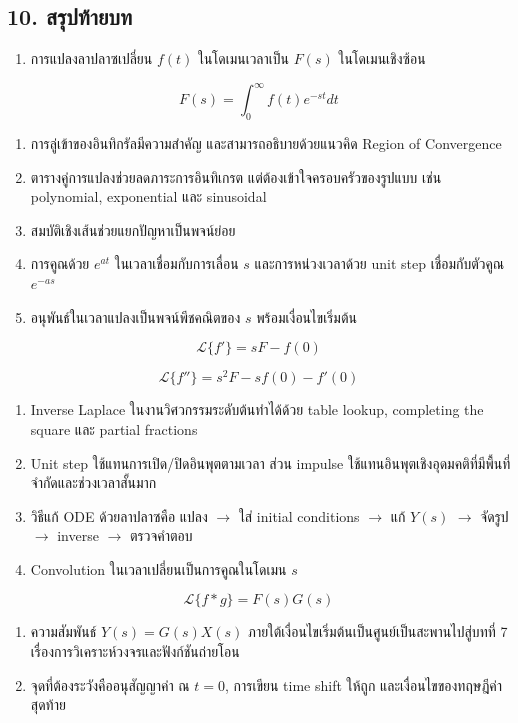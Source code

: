 \subsection{10. สรุปท้ายบท}

\begin{enumerate}
    \item การแปลงลาปลาซเปลี่ยน $f(t)$ ในโดเมนเวลาเป็น $F(s)$ ในโดเมนเชิงซ้อน
\end{enumerate}

\[
F(s)=\int_0^\infty f(t)e^{-st}dt
\]

\begin{enumerate}
    \item การลู่เข้าของอินทิกรัลมีความสำคัญ และสามารถอธิบายด้วยแนวคิด Region of Convergence
    \item ตารางคู่การแปลงช่วยลดภาระการอินทิเกรต แต่ต้องเข้าใจครอบครัวของรูปแบบ เช่น polynomial, exponential และ sinusoidal
    \item สมบัติเชิงเส้นช่วยแยกปัญหาเป็นพจน์ย่อย
    \item การคูณด้วย $e^{at}$ ในเวลาเชื่อมกับการเลื่อน $s$ และการหน่วงเวลาด้วย unit step เชื่อมกับตัวคูณ $e^{-as}$
    \item อนุพันธ์ในเวลาแปลงเป็นพจน์พีชคณิตของ $s$ พร้อมเงื่อนไขเริ่มต้น
\end{enumerate}

\[
\mathcal{L}\{f'\}=sF-f(0)
\]

\[
\mathcal{L}\{f''\}=s^2F-sf(0)-f'(0)
\]

\begin{enumerate}
    \item Inverse Laplace ในงานวิศวกรรมระดับต้นทำได้ด้วย table lookup, completing the square และ partial fractions
    \item Unit step ใช้แทนการเปิด/ปิดอินพุตตามเวลา ส่วน impulse ใช้แทนอินพุตเชิงอุดมคติที่มีพื้นที่จำกัดและช่วงเวลาสั้นมาก
    \item วิธีแก้ ODE ด้วยลาปลาซคือ แปลง $\to$ ใส่ initial conditions $\to$ แก้ $Y(s)$ $\to$ จัดรูป $\to$ inverse $\to$ ตรวจคำตอบ
    \item Convolution ในเวลาเปลี่ยนเป็นการคูณในโดเมน $s$
\end{enumerate}

\[
\mathcal{L}\{f*g\}=F(s)G(s)
\]

\begin{enumerate}
    \item ความสัมพันธ์ $Y(s)=G(s)X(s)$ ภายใต้เงื่อนไขเริ่มต้นเป็นศูนย์เป็นสะพานไปสู่บทที่ 7 เรื่องการวิเคราะห์วงจรและฟังก์ชันถ่ายโอน
    \item จุดที่ต้องระวังคืออนุสัญญาค่า ณ $t=0$, การเขียน time shift ให้ถูก และเงื่อนไขของทฤษฎีค่าสุดท้าย
\end{enumerate}



